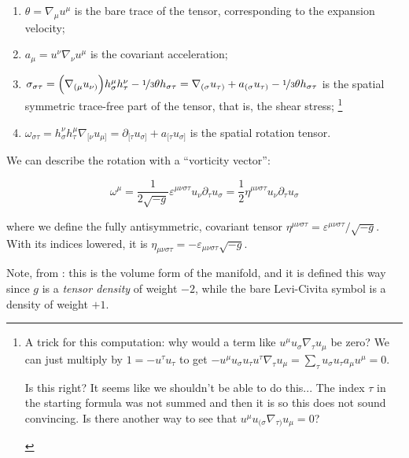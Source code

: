 \documentclass[main.tex]{subfiles}
\begin{document}
\begin{enumerate}
    \item \(\theta = \nabla_\mu u^\mu\) is the bare trace of the tensor, corresponding to the expansion velocity;
    \item \(a_\mu = u^\nu \nabla_\nu u^\mu\) is the covariant acceleration;
    \item \(\sigma_{\sigma \tau} = \qty(\nabla_{(\mu} u_{\nu)}) h^\mu_\sigma h^\nu _\tau - \frac[i]{1}{3} \theta h_{\sigma \tau} = \nabla_{(\sigma} u_{\tau)} + a_{(\sigma} u_{\tau)} - \frac[i]{1}{3} \theta h_{\sigma \tau} \) is the spatial symmetric trace-free part of the tensor, that is, the shear stress;
    \footnote{A trick for this computation: why would a term like \(u^\mu u_\sigma \nabla_\tau u_\mu\) be zero? We can just multiply by \(1 = - u^\tau u_\tau\) to get \(-u^\mu u_\sigma u_\tau u^\tau \nabla_\tau u_\mu = \sum_\tau u_\sigma u_\tau a_\mu u^\mu = 0\).
    \begin{greenbox}
        Is this right? It seems like we shouldn't be able to do this... The index \(\tau\) in the starting formula was not summed and then it is so this does not sound convincing. Is there another way to see that \(u^\mu u_{(\sigma} \nabla_{\tau)} u_\mu = 0\)?
    \end{greenbox}}
    \item \(\omega_{\sigma \tau} = h^\nu_\sigma h^\mu_\tau \nabla_{[\nu} u_{\mu]} = \partial_{[\tau} u_{\sigma]} + a_{[\tau} u_{\sigma]}\) is the spatial rotation tensor.
\end{enumerate}

We can describe the rotation with a ``vorticity vector'':

\begin{equation}
    \omega^\mu = \frac{1}{2 \sqrt{-g}} \varepsilon^{\mu\nu\sigma\tau} u_\nu \partial_\tau u_{\sigma} = \frac{1}{2} \eta^{\mu\nu\sigma\tau} u_\nu \partial_\tau u_{\sigma}
\end{equation}

where we define the fully antisymmetric, covariant tensor \(\eta^{\mu\nu\sigma\tau} = \varepsilon^{\mu\nu\sigma\tau} / \sqrt{-g} \). With its indices lowered, it is
\(\eta_{\mu\nu\sigma\tau} = - \varepsilon_{\mu\nu\sigma\tau} \sqrt{-g} \).

Note, from \cite[pages 51--52]{Carroll:1997ar}: this is the volume form of the manifold, and it is defined this way since \(g\) is a \emph{tensor density} of weight $-2$, while the bare Levi-Civita symbol is a density of weight $+1$.
\end{document}
